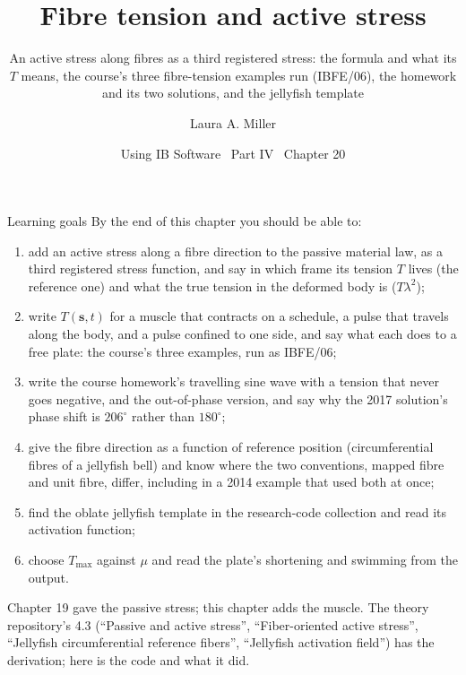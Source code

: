 \documentclass[aspectratio=169,11pt]{beamer}
\title[Fibre tension and active stress]{Fibre tension and active stress}
\subtitle{An active stress along fibres as a third registered stress: the formula and what its $T$ means, the course's three fibre-tension examples run (IBFE/06), the homework and its two solutions, and the jellyfish template}
\author[Miller]{Laura A. Miller}
\institute[UArizona]{Department of Mathematics, University of Arizona}
\date{Using IB Software \textbullet\ Part IV \textbullet\ Chapter 20}
\begin{document}
\begin{frame}[plain]
\end{frame}

\begin{frame}{Learning goals}
\label{fr:goals}
\footnotesize By the end of this chapter you should be able to:
\begin{enumerate}
  \item add an active stress along a fibre direction to the passive material law, as a third registered stress function, and say in which frame its tension $T$ lives (the reference one) and what the true tension in the deformed body is ($T\lambda^2$);
  \item write $T(\mathbf{s}, t)$ for a muscle that contracts on a schedule, a pulse that travels along the body, and a pulse confined to one side, and say what each does to a free plate: the course's three examples, run as IBFE/06;
  \item write the course homework's travelling sine wave with a tension that never goes negative, and the out-of-phase version, and say why the 2017 solution's phase shift is $206^\circ$ rather than $180^\circ$;
  \item give the fibre direction as a function of reference position (circumferential fibres of a jellyfish bell) and know where the two conventions, mapped fibre and unit fibre, differ, including in a 2014 example that used both at once;
  \item find the oblate jellyfish template in the research-code collection and read its activation function;
  \item choose $T_{\max}$ against $\mu$ and read the plate's shortening and swimming from the output.
\end{enumerate}
\begin{punchbox}
\footnotesize Chapter 19 gave the passive stress; this chapter adds the muscle. The theory repository's 4.3 (``Passive and active stress'', ``Fiber-oriented active stress'', ``Jellyfish circumferential reference fibers'', ``Jellyfish activation field'') has the derivation; here is the code and what it did.
\end{punchbox}
\end{frame}
\end{document}
